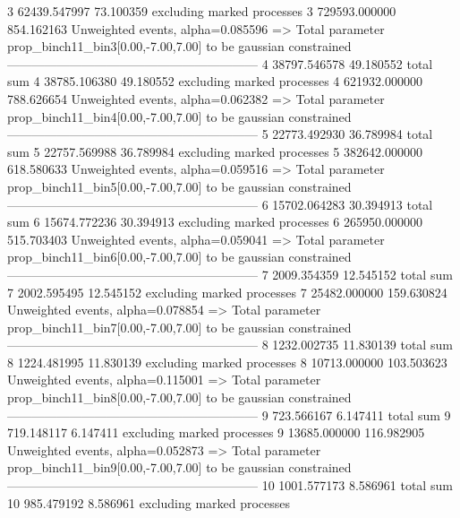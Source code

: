3          62439.547997    73.100359       excluding marked processes    
3          729593.000000   854.162163      Unweighted events, alpha=0.085596
  => Total parameter prop_binch11_bin3[0.00,-7.00,7.00] to be gaussian constrained
------------------------------------------------------------
4          38797.546578    49.180552       total sum                     
4          38785.106380    49.180552       excluding marked processes    
4          621932.000000   788.626654      Unweighted events, alpha=0.062382
  => Total parameter prop_binch11_bin4[0.00,-7.00,7.00] to be gaussian constrained
------------------------------------------------------------
5          22773.492930    36.789984       total sum                     
5          22757.569988    36.789984       excluding marked processes    
5          382642.000000   618.580633      Unweighted events, alpha=0.059516
  => Total parameter prop_binch11_bin5[0.00,-7.00,7.00] to be gaussian constrained
------------------------------------------------------------
6          15702.064283    30.394913       total sum                     
6          15674.772236    30.394913       excluding marked processes    
6          265950.000000   515.703403      Unweighted events, alpha=0.059041
  => Total parameter prop_binch11_bin6[0.00,-7.00,7.00] to be gaussian constrained
------------------------------------------------------------
7          2009.354359     12.545152       total sum                     
7          2002.595495     12.545152       excluding marked processes    
7          25482.000000    159.630824      Unweighted events, alpha=0.078854
  => Total parameter prop_binch11_bin7[0.00,-7.00,7.00] to be gaussian constrained
------------------------------------------------------------
8          1232.002735     11.830139       total sum                     
8          1224.481995     11.830139       excluding marked processes    
8          10713.000000    103.503623      Unweighted events, alpha=0.115001
  => Total parameter prop_binch11_bin8[0.00,-7.00,7.00] to be gaussian constrained
------------------------------------------------------------
9          723.566167      6.147411        total sum                     
9          719.148117      6.147411        excluding marked processes    
9          13685.000000    116.982905      Unweighted events, alpha=0.052873
  => Total parameter prop_binch11_bin9[0.00,-7.00,7.00] to be gaussian constrained
------------------------------------------------------------
10         1001.577173     8.586961        total sum                     
10         985.479192      8.586961        excluding marked processes    
